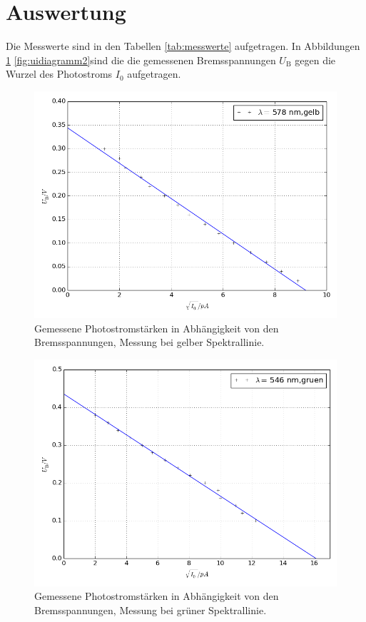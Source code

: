\section{Auswertung}
\label{sec:Auswertung}
Die Messwerte sind in den Tabellen \ref{tab:messwerte} aufgetragen.
In Abbildungen \ref{fig:uidiagramm1} \ref{fig:uidiagramm2}sind die die gemessenen Bremsspannungen $U_\text{B}$ gegen die Wurzel des Photostroms $I_0$ aufgetragen.

\begin{figure}[p]
	\centering
	\includegraphics[width=\textwidth]{Bilder/Fit_gelb.png}
	\caption{Gemessene Photostromstärken in Abhängigkeit von den Bremsspannungen, Messung bei gelber Spektrallinie.}
	\label{fig:uidiagramm1}
\end{figure}
\begin{figure}[p]
	\centering
	\includegraphics[width=\textwidth]{Bilder/Fit_gruen.png}
	\caption{Gemessene Photostromstärken in Abhängigkeit von den Bremsspannungen, Messung bei grüner Spektrallinie.}
	\label{fig:label}
\end{figure}
